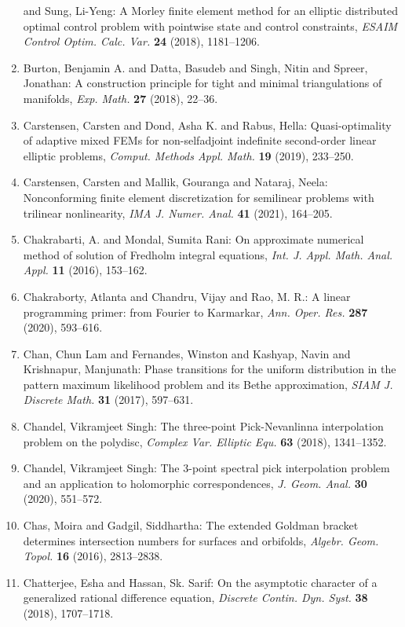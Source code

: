 \begin{enumerate}
and Sung, Li-Yeng: A {M}orley finite element method for an elliptic distributed
optimal control problem with pointwise state and control
constraints, \emph{ESAIM Control Optim. Calc. Var.} {\bf 24} (2018), 1181--1206.
\item Burton, Benjamin A. and Datta, Basudeb and Singh, Nitin and
Spreer, Jonathan: A construction principle for tight and minimal triangulations
of manifolds, \emph{Exp. Math.} {\bf 27} (2018), 22--36.
\item Carstensen, Carsten and Dond, Asha K. and Rabus, Hella: Quasi-optimality of adaptive mixed {FEM}s for non-selfadjoint
indefinite second-order linear elliptic problems, \emph{Comput. Methods Appl. Math.} {\bf 19} (2019), 233--250.
\item Carstensen, Carsten and Mallik, Gouranga and Nataraj, Neela: Nonconforming finite element discretization for semilinear
problems with trilinear nonlinearity, \emph{IMA J. Numer. Anal.} {\bf 41} (2021), 164--205.
\item Chakrabarti, A. and Mondal, Sumita Rani: On approximate numerical method of solution of {F}redholm
integral equations, \emph{Int. J. Appl. Math. Anal. Appl.} {\bf 11} (2016), 153--162.
\item Chakraborty, Atlanta and Chandru, Vijay and Rao, M. R.: A linear programming primer: from {F}ourier to {K}armarkar, \emph{Ann. Oper. Res.} {\bf 287} (2020), 593--616.
\item Chan, Chun Lam and Fernandes, Winston and Kashyap, Navin and
Krishnapur, Manjunath: Phase transitions for the uniform distribution in the pattern
maximum likelihood problem and its {B}ethe approximation, \emph{SIAM J. Discrete Math.} {\bf 31} (2017), 597--631.
\item Chandel, Vikramjeet Singh: The three-point {P}ick-{N}evanlinna interpolation problem on
the polydisc, \emph{Complex Var. Elliptic Equ.} {\bf 63} (2018), 1341--1352.
\item Chandel, Vikramjeet Singh: The 3-point spectral pick interpolation problem and an
application to holomorphic correspondences, \emph{J. Geom. Anal.} {\bf 30} (2020), 551--572.
\item Chas, Moira and Gadgil, Siddhartha: The extended {G}oldman bracket determines intersection numbers
for surfaces and orbifolds, \emph{Algebr. Geom. Topol.} {\bf 16} (2016), 2813--2838.
\item Chatterjee, Esha and Hassan, Sk. Sarif: On the asymptotic character of a generalized rational
difference equation, \emph{Discrete Contin. Dyn. Syst.} {\bf 38} (2018), 1707--1718.

\end{enumerate}
